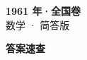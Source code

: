 \documentclass[zihao=-4, a4paper]{ctexart}
\begin{document}
\begin{center}
  {\Large\bfseries 1961 年·全国卷}\\[4pt]
  {\large 数学 · 简答版}
\end{center}
\medskip
{}

\clearpage
{}
\begin{center}{\Large\bfseries 答案速查}\end{center}
\medskip

\end{document}
